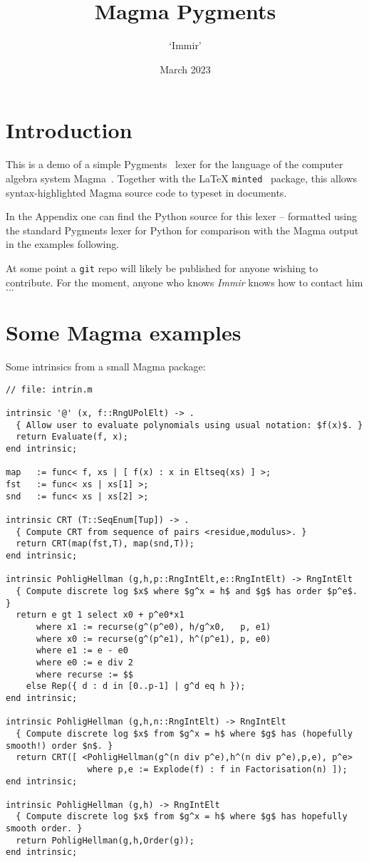 \documentclass{article}
\title{Magma Pygments}
\author{`Immir'}
\date{March 2023}
\begin{document}
\maketitle

\section{Introduction}

This is a demo of a simple Pygments~\cite{pygments} lexer for the
language of the computer algebra system Magma~\cite{magma}.  Together
with the \LaTeX{} \texttt{minted}~\cite{minted} package, this allows
syntax-highlighted Magma source code to typeset in documents.

In the Appendix one can find the Python source for this lexer --
formatted using the standard Pygments lexer for Python for comparison
with the Magma output in the examples following.

At some point a \texttt{git} repo will likely be published for anyone
wishing to contribute. For the moment, anyone who knows \textit{Immir}
knows how to contact him$\ldots$

\section{Some Magma examples}

Some intrinsics from a small Magma package:

\begin{verbatim}
// file: intrin.m

intrinsic '@' (x, f::RngUPolElt) -> .
  { Allow user to evaluate polynomials using usual notation: $f(x)$. }
  return Evaluate(f, x);
end intrinsic;

map   := func< f, xs | [ f(x) : x in Eltseq(xs) ] >;
fst   := func< xs | xs[1] >;
snd   := func< xs | xs[2] >;

intrinsic CRT (T::SeqEnum[Tup]) -> .
  { Compute CRT from sequence of pairs <residue,modulus>. }
  return CRT(map(fst,T), map(snd,T));
end intrinsic;

intrinsic PohligHellman (g,h,p::RngIntElt,e::RngIntElt) -> RngIntElt
  { Compute discrete log $x$ where $g^x = h$ and $g$ has order $p^e$. }
  return e gt 1 select x0 + p^e0*x1
      where x1 := recurse(g^(p^e0), h/g^x0,   p, e1)
      where x0 := recurse(g^(p^e1), h^(p^e1), p, e0)
      where e1 := e - e0
      where e0 := e div 2
      where recurse := $$
    else Rep({ d : d in [0..p-1] | g^d eq h });
end intrinsic;

intrinsic PohligHellman (g,h,n::RngIntElt) -> RngIntElt
  { Compute discrete log $x$ from $g^x = h$ where $g$ has (hopefully smooth!) order $n$. }
  return CRT([ <PohligHellman(g^(n div p^e),h^(n div p^e),p,e), p^e>
                where p,e := Explode(f) : f in Factorisation(n) ]);
end intrinsic;

intrinsic PohligHellman (g,h) -> RngIntElt
  { Compute discrete log $x$ from $g^x = h$ where $g$ has hopefully smooth order. }
  return PohligHellman(g,h,Order(g));
end intrinsic;
\end{verbatim}
\end{document}
